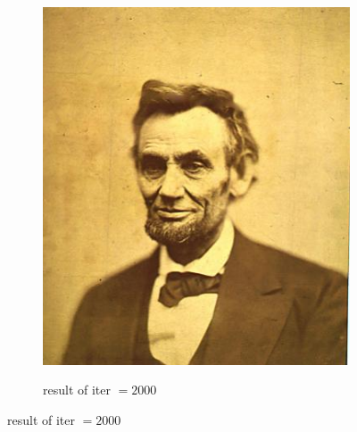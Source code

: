 \documentclass[paper=a4, fontsize=11pt]{scrartcl} %
\numberwithin{equation}{section} %
\numberwithin{figure}{section} %
\numberwithin{table}{section} %
\begin{document}
\begin{figure}[H]
\begin{subfigure}[b]{0.45\textwidth}
{		  \includegraphics[width=\textwidth]{inpainter2000.jpg}
		}
	\caption{result of iter $=2000$}
	\end{subfigure}
\end{figure}





% 
%
\end{document}
